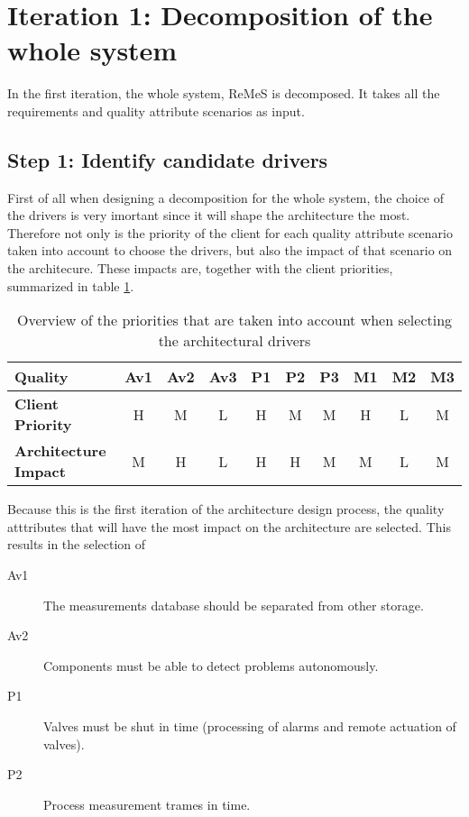 \section{Iteration 1: Decomposition of the whole system}
\label{add:it1}

\npar In the first iteration, the whole system, ReMeS is decomposed. It takes
all the requirements and quality attribute scenarios as input.

\subsection{Step 1: Identify candidate drivers}
\label{add:it1/drivers}

\npar First of all when designing a decomposition for the whole system, the
choice of the drivers is very imortant since it will shape the architecture the
most. Therefore not only is the priority of the client for each quality
attribute scenario taken into account to choose the drivers, but also the impact of
that scenario on the architecure. These impacts are, together with the client
priorities, summarized in table \ref{table:add/it1/priorities}.

\begin{table}[H]
	\begin{center}
		\begin{tabular}{|l|c|c|c|c|c|c|c|c|c|}
		\hline
		\textbf{Quality}			&	Av1	&	Av2	&	Av3	&	P1	&	P2	&	P3	&	M1	&	M2	&	M3	\\
		\hline
		\textbf{Client Priority}	&	H	&	M	&	L	&	H	&	M	&	M	&	H	&	L	&	M	\\
		\hline
		\textbf{Architecture Impact}&	M	&	H	&	L	&	H	&	H	&	M	&	M	&	L	&	M	\\
		\hline
		\end{tabular}
		\caption{Overview of the priorities that are taken into account when
		selecting the architectural drivers}
		\label{table:add/it1/priorities}
	\end{center}
\end{table}

\npar Because this is the first iteration of the architecture design process,
the quality atttributes that will have the most impact on the architecture
are selected. This results in the selection of
\begin{description}
  	\item[Av1] The measurements database should be separated from other storage. 
  	\item[Av2] Components must be able to detect problems autonomously.
  	\item[P1] Valves must be shut in time (processing of alarms and remote
  	actuation of valves).
  	\item[P2] Process measurement trames in time. 
\end{description}

